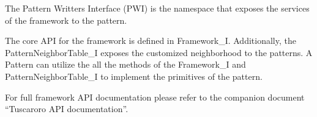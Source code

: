 
The Pattern Writters Interface (PWI) is the namespace that exposes the
services of the framework to the pattern. 

The core API for the framework is defined in
Framework\_I. Additionally, the PatternNeighborTable\_I exposes
the customized neighborhood to the patterns.
A Pattern can utilize the all the methods of the Framework\_I and PatternNeighborTable\_I to implement the primitives of the pattern.

For full framework API documentation please refer to the companion document ``Tuscaroro API documentation''.

%
